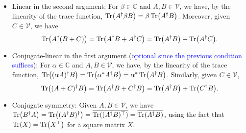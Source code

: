 \documentclass{article}
\theoremstyle{definition}
\newcommand{\al}{\alpha}
\newcommand{\be}{\beta}
\begin{document}
\begin{enumerate}[label = (\alph*)]
\begin{itemize}
		
		\item Linear in the second argument: For $\be \in \mathbb{C}$ and $A,B\in \mathcal{V}$, we have, by the linearity of the trace function, $\Tr(A^\dagger \be B) =  \be \Tr(A^\dagger B)$. Moreover, given $C\in \mathcal{V}$, we have
		\begin{align*}
		\Tr(A^\dagger (B+C)) = \Tr(A^\dagger B + A^\dagger C) = \Tr(A^\dagger B) + \Tr(A^\dagger C). 
		\end{align*}
	
		\item Conjugate-linear in the first argument (\textcolor{blue}{optional since the previous condition suffices}): For $\al \in \mathbb{C}$ and $A,B\in \mathcal{V}$, we have, by the linearity of the trace function, $\Tr((\al A)^\dagger B) =   \Tr(\al^* A^\dagger B) = \al^* \Tr(A^\dagger B)$. Similarly, given $C\in \mathcal{V}$, 
		\begin{align*}
		\Tr((A+C)^\dagger B) = \Tr(A^\dagger B + C^\dagger B) = \Tr(A^\dagger B) + \Tr(C^\dagger B). 
		\end{align*}
		
		\item Conjugate symmetry: Given $A,B\in \mathcal{V}$, we have $\Tr(B^\dagger A)= \Tr((A^\dagger B)^\dagger) = \overline{\Tr((A^\dagger B)^\top)} = \overline{\Tr(A^\dagger B)}$, using the fact that $\Tr(X) = \Tr(X^\top)$ for a square matrix $X$. 
		
	\end{itemize}






\end{enumerate}
\end{document}
